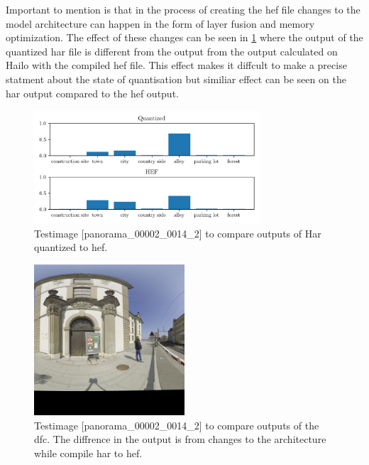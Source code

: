 Important to mention is that in the process of creating the \acrshort{hef} file changes to the model architecture can happen in the form of 
layer fusion and memory optimization.
The effect of these changes can be seen in \cref{methods:fig:comparern50harhef} where the output of the quantized \acrshort{har} file is different from the output from the output calculated on Hailo with the compiled \acrshort{hef} file.
This effect makes it diffcult to make a precise statment about the state of quantisation but similiar effect can be seen on the \acrshort{har} output compared to the \acrshort{hef} output.

\begin{figure}
    \centering
    \includegraphics[width=0.75\textwidth]{Images/Implementation/compareProbs_RN50_quant_Hef.png}
    \caption{Testimage [panorama\_00002\_0014\_2] to compare outputs of Har quantized to \acrshort{hef}.}
    \label{methods:fig:comparern50harhef}
\end{figure}

\begin{figure}
    \centering
    \includegraphics[width=0.5\textwidth]{Images/Implementation/panorama_00002_0014_2_testIMg.jpg}
    \caption{Testimage [panorama\_00002\_0014\_2] to compare outputs of the \acrshort{dfc}. The diffrence in the output is from changes to the architecture while compile \acrshort{har} to \acrshort{hef}.}
    \label{methods:fig:comparetestpic}
\end{figure}



